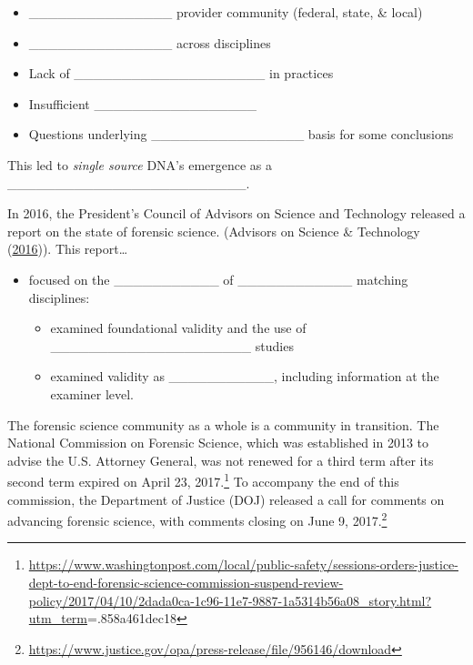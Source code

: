 \documentclass[]{book}
\providecommand{\tightlist}{%
  \setlength{\itemsep}{0pt}\setlength{\parskip}{0pt}}
\let\rmarkdownfootnote\footnote%
\def\footnote{\protect\rmarkdownfootnote}
\theoremstyle{definition}
\theoremstyle{definition}
\theoremstyle{remark}
\begin{document}
\begin{itemize}
\tightlist
\item
  \_\_\_\_\_\_\_\_\_\_\_\_\_\_\_ provider community (federal, state, \&
  local) \vspace{.1in}
\item
  \_\_\_\_\_\_\_\_\_\_\_\_\_\_\_ across disciplines \vspace{.1in}
\item
  Lack of \_\_\_\_\_\_\_\_\_\_\_\_\_\_\_\_\_\_\_\_ in practices
  \vspace{.1in}
\item
  Insufficient \_\_\_\_\_\_\_\_\_\_\_\_\_\_\_\_\_ \vspace{.1in}
\item
  Questions underlying \_\_\_\_\_\_\_\_\_\_\_\_\_\_\_\_ basis for some
  conclusions
\end{itemize}

This led to \emph{single source} DNA's emergence as a
\_\_\_\_\_\_\_\_\_\_\_\_\_\_\_\_\_\_\_\_\_\_\_\_\_.

In 2016, the President's Council of Advisors on Science and Technology
released a report on the state of forensic science. (Advisors on Science
\& Technology (\protect\hyperlink{ref-pcast}{2016})). This
report\ldots{} \vspace{.1in}

\begin{itemize}
\tightlist
\item
  focused on the \_\_\_\_\_\_\_\_\_\_\_ of \_\_\_\_\_\_\_\_\_\_\_\_
  matching disciplines: \vspace{.1in}

  \begin{itemize}
  \tightlist
  \item
    examined foundational validity and the use of
    \_\_\_\_\_\_\_\_\_\_\_\_\_\_\_\_\_\_\_\_\_ studies \vspace{.1in}
  \item
    examined validity as \_\_\_\_\_\_\_\_\_\_\_, including information
    at the examiner level.
  \end{itemize}
\end{itemize}

The forensic science community as a whole is a community in transition.
The National Commission on Forensic Science, which was established in
2013 to advise the U.S. Attorney General, was not renewed for a third
term after its second term expired on April 23, 2017.\footnote{\url{https://www.washingtonpost.com/local/public-safety/sessions-orders-justice-dept-to-end-forensic-science-commission-suspend-review-policy/2017/04/10/2dada0ca-1c96-11e7-9887-1a5314b56a08_story.html?utm_term}=.858a461dec18}
To accompany the end of this commission, the Department of Justice (DOJ)
released a call for comments on advancing forensic science, with
comments closing on June 9, 2017.\footnote{\url{https://www.justice.gov/opa/press-release/file/956146/download}}
\end{document}
